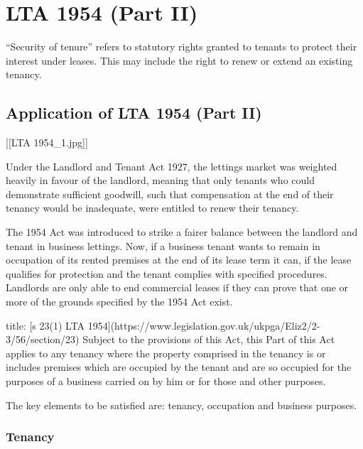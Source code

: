 \documentclass[
]{article}
\newenvironment{Shaded}{}{}
\newcommand{\NormalTok}[1]{#1}
\begin{document}
\hypertarget{lta-1954-part-ii}{%
\section{LTA 1954 (Part II)}\label{lta-1954-part-ii}}

``Security of tenure'' refers to statutory rights granted to tenants to
protect their interest under leases. This may include the right to renew
or extend an existing tenancy.

\hypertarget{application-of-lta-1954-part-ii}{%
\subsection{Application of LTA 1954 (Part
II)}\label{application-of-lta-1954-part-ii}}

{[}{[}LTA 1954\_1.jpg{]}{]}

Under the Landlord and Tenant Act 1927, the lettings market was weighted
heavily in favour of the landlord, meaning that only tenants who could
demonstrate sufficient goodwill, such that compensation at the end of
their tenancy would be inadequate, were entitled to renew their tenancy.

The 1954 Act was introduced to strike a fairer balance between the
landlord and tenant in business lettings. Now, if a business tenant
wants to remain in occupation of its rented premises at the end of its
lease term it can, if the lease qualifies for protection and the tenant
complies with specified procedures. Landlords are only able to end
commercial leases if they can prove that one or more of the grounds
specified by the 1954 Act exist.

\begin{Shaded}
\begin{Highlighting}[]
\NormalTok{title: [s 23(1) LTA 1954](https://www.legislation.gov.uk/ukpga/Eliz2/2{-}3/56/section/23) }
\NormalTok{Subject to the provisions of this Act, this Part of this Act applies to any tenancy where the property comprised in the tenancy is or includes premises which are occupied by the tenant and are so occupied for the purposes of a business carried on by him or for those and other purposes.}
\end{Highlighting}
\end{Shaded}

The key elements to be satisfied are: tenancy, occupation and business
purposes.

\hypertarget{tenancy}{%
\subsubsection{Tenancy}\label{tenancy}}
\end{document}
